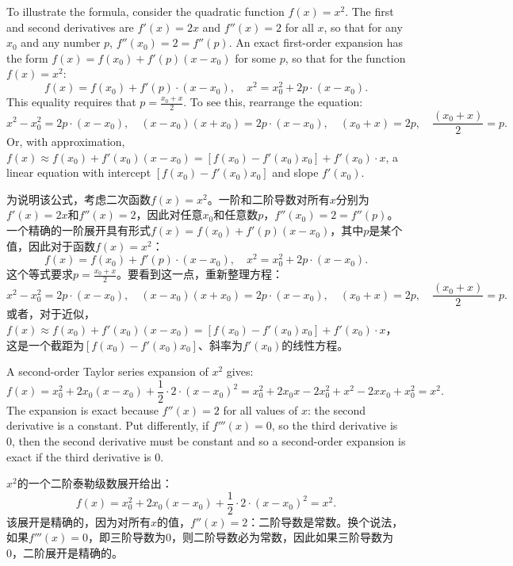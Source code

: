 \begin{original}
To illustrate the formula, consider the quadratic function $f(x) = x^2$. The first and second derivatives are $f'(x) = 2x$ and $f''(x) = 2$ for all $x$, so that for any $x_0$ and any number $p$, $f''(x_0) = 2 = f''(p)$. An exact first-order expansion has the form $f(x) = f(x_0) + f'(p)(x - x_0)$ for some $p$, so that for the function $f(x) = x^2$:
\[
f(x) = f(x_0) + f'(p) \cdot (x - x_0), \quad x^2 = x_0^2 + 2p \cdot (x - x_0).
\]
This equality requires that $p = \frac{x_0 + x}{2}$. To see this, rearrange the equation:
\[
x^2 - x_0^2 = 2p \cdot (x - x_0), \quad (x - x_0)(x + x_0) = 2p \cdot (x - x_0), \quad (x_0 + x) = 2p, \quad \frac{(x_0 + x)}{2} = p.
\]
Or, with approximation, $f(x) \approx f(x_0) + f'(x_0)(x - x_0) = [f(x_0) - f'(x_0)x_0] + f'(x_0) \cdot x$, a linear equation with intercept $[f(x_0) - f'(x_0)x_0]$ and slope $f'(x_0)$.
\end{original}
\begin{translation}
为说明该公式，考虑二次函数$f(x) = x^2$。一阶和二阶导数对所有$x$分别为$f'(x) = 2x$和$f''(x) = 2$，因此对任意$x_0$和任意数$p$，$f''(x_0) = 2 = f''(p)$。一个精确的一阶展开具有形式$f(x) = f(x_0) + f'(p)(x - x_0)$，其中$p$是某个值，因此对于函数$f(x) = x^2$：
\[
f(x) = f(x_0) + f'(p) \cdot (x - x_0), \quad x^2 = x_0^2 + 2p \cdot (x - x_0).
\]
这个等式要求$p = \frac{x_0 + x}{2}$。要看到这一点，重新整理方程：
\[
x^2 - x_0^2 = 2p \cdot (x - x_0), \quad (x - x_0)(x + x_0) = 2p \cdot (x - x_0), \quad (x_0 + x) = 2p, \quad \frac{(x_0 + x)}{2} = p.
\]
或者，对于近似，$f(x) \approx f(x_0) + f'(x_0)(x - x_0) = [f(x_0) - f'(x_0)x_0] + f'(x_0) \cdot x$，这是一个截距为$[f(x_0) - f'(x_0)x_0]$、斜率为$f'(x_0)$的线性方程。
\end{translation}

\begin{original}
A second-order Taylor series expansion of $x^2$ gives:
\[
f(x) = x_0^2 + 2x_0(x - x_0) + \frac{1}{2} \cdot 2 \cdot (x - x_0)^2 = x_0^2 + 2x_0 x - 2x_0^2 + x^2 - 2x x_0 + x_0^2 = x^2.
\]
The expansion is exact because $f''(x) = 2$ for all values of $x$: the second derivative is a constant. Put differently, if $f'''(x) = 0$, so the third derivative is 0, then the second derivative must be constant and so a second-order expansion is exact if the third derivative is 0.
\end{original}
\begin{translation}
$x^2$的一个二阶泰勒级数展开给出：
\[
f(x) = x_0^2 + 2x_0(x - x_0) + \frac{1}{2} \cdot 2 \cdot (x - x_0)^2 = x^2.
\]
该展开是精确的，因为对所有$x$的值，$f''(x) = 2$：二阶导数是常数。换个说法，如果$f'''(x) = 0$，即三阶导数为0，则二阶导数必为常数，因此如果三阶导数为0，二阶展开是精确的。
\end{translation}

